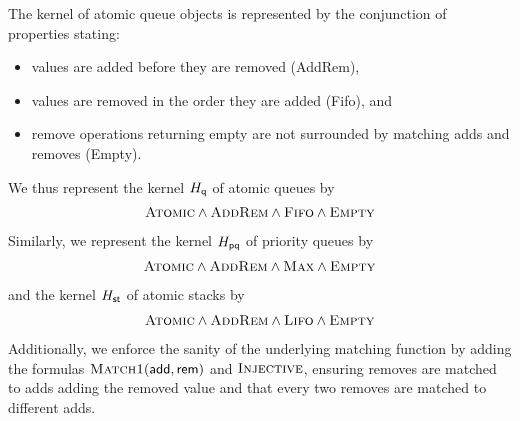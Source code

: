 \begin{example}

  The kernel of atomic queue objects is represented by the conjunction of properties stating:
  \begin{itemize}

    \item values are added before they are removed ({\sc AddRem}),

    \item values are removed in the order they are added ({\sc Fifo}), and

    \item remove operations returning empty are not surrounded by matching adds
    and removes ({\sc Empty}).

  \end{itemize}
  We thus represent the kernel $H_{\sf q}$ of atomic queues by
  \begin{align*}
    \textsc{Atomic}  \land \textsc{AddRem}
      \land \textsc{Fifo} \land \textsc{Empty}
  \end{align*}
  Similarly, we represent the kernel $H_{\sf pq}$ of priority queues by
  \begin{align*}
    \textsc{Atomic} \land \textsc{AddRem}
      \land \textsc{Max} \land \textsc{Empty}
  \end{align*}
  and the kernel $H_{\sf st}$ of atomic stacks by
  \begin{align*}
    \textsc{Atomic} \land \textsc{AddRem}
      \land \textsc{Lifo} \land \textsc{Empty}
  \end{align*}
  Additionally, we enforce the sanity of the underlying matching function by
  adding the formulas $\textsc{Match1}({\sf add},{\sf
  rem})$ and $\textsc{Injective}$, ensuring removes are matched to adds adding 
  the removed value and that every two removes are matched to different adds.

\end{example}

